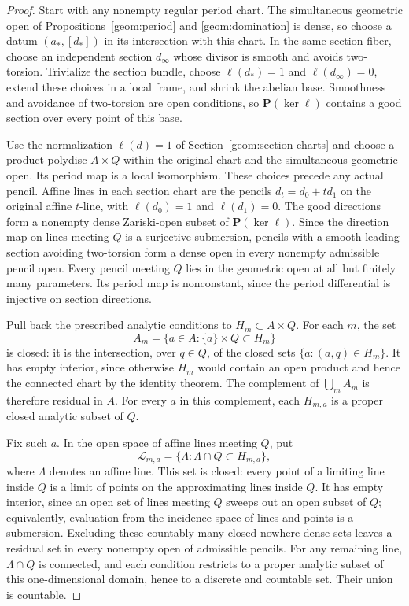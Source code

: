 \documentclass[11pt]{amsart}
\newcommand{\PP}{\mathbf P}
\theoremstyle{definition}
\theoremstyle{remark}
\numberwithin{equation}{section}
\begin{document}
\begin{proof}

Start with any nonempty regular period chart.  The simultaneous
geometric open of Propositions~\ref{geom:period} and
\ref{geom:domination} is dense, so choose a datum $(a_*,[d_*])$
in its intersection with this chart.  In the same section fiber,
choose an independent section $d_\infty$ whose divisor is smooth
and avoids two-torsion.  Trivialize the section bundle, choose
$\ell(d_*)=1$ and $\ell(d_\infty)=0$, extend these choices in a
local frame, and shrink the abelian base.  Smoothness and avoidance
of two-torsion are open conditions, so $\PP(\ker\ell)$ contains
a good section over every point of this base.

Use the normalization $\ell(d)=1$ of
Section~\ref{geom:section-charts} and choose a product polydisc
$A\times Q$ within the original chart and the simultaneous
geometric open.  Its period map is a local isomorphism.  These
choices precede any actual pencil.  Affine lines in each section
chart are the pencils $d_t=d_0+t d_1$ on the original affine
$t$-line, with $\ell(d_0)=1$ and $\ell(d_1)=0$.
The good directions form a nonempty dense Zariski-open subset of
$\PP(\ker\ell)$.  Since the direction map on lines meeting $Q$
is a surjective submersion, pencils with a smooth leading section
avoiding two-torsion form a dense open in every nonempty admissible
pencil open.  Every pencil meeting $Q$ lies in the geometric open
at all but finitely many parameters.  Its period map is nonconstant,
since the period differential is injective on section directions.

Pull back the prescribed analytic conditions to
$H_m\subset A\times Q$.  For each $m$, the set
\[
 A_m=\{a\in A:\{a\}\times Q\subset H_m\}
\]
is closed: it is the intersection, over $q\in Q$, of the closed
sets $\{a:(a,q)\in H_m\}$.  It has empty interior, since otherwise
$H_m$ would contain an open product and hence the connected chart
by the identity theorem.  The complement of $\bigcup_m A_m$ is
therefore residual in $A$.  For every $a$ in this complement, each
$H_{m,a}$ is a proper closed analytic subset of $Q$.

Fix such $a$.  In the open space of affine lines meeting $Q$, put
\[
 \mathcal L_{m,a}=\{\Lambda:\Lambda\cap Q\subset H_{m,a}\},
\]
where $\Lambda$ denotes an affine line.
This set is closed: every point of a limiting line inside $Q$ is a
limit of points on the approximating lines inside $Q$.  It has empty
interior, since an open set of lines meeting $Q$ sweeps out an open
subset of $Q$; equivalently, evaluation from the incidence space of
lines and points is a submersion.  Excluding these countably many
closed nowhere-dense sets leaves a residual set in every nonempty
open of admissible pencils.  For any remaining line, $\Lambda\cap Q$
is connected, and each condition restricts to a proper analytic
subset of this one-dimensional domain, hence to a discrete and
countable set.  Their union is countable.


\end{proof}
\end{document}
